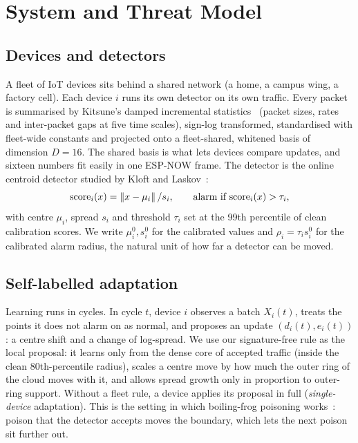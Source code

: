\section{System and Threat Model}\label{sec:model}

\subsection{Devices and detectors}
A fleet of IoT devices sits behind a shared network (a home, a campus wing, a factory cell). Each
device $i$ runs its own detector on its own traffic. Every packet is summarised by Kitsune's damped
incremental statistics~\cite{kitsune} (packet sizes, rates and inter-packet gaps at five time scales),
sign-log transformed, standardised with fleet-wide constants and projected onto a fleet-shared, whitened
basis of dimension $D=16$. The shared basis is what lets devices compare updates, and sixteen numbers
fit easily in one ESP-NOW frame. The detector is the online centroid detector studied by Kloft and Laskov~\cite{kloft}:
\begin{equation}
  \mathrm{score}_i(x) = \left\lVert x-\mu_i \right\rVert/s_i, \qquad \text{alarm if } \mathrm{score}_i(x) > \tau_i,
\end{equation}
with centre $\mu_i$, spread $s_i$ and threshold $\tau_i$ set at the 99th percentile of clean
calibration scores. We write $\mu_i^0, s_i^0$ for the calibrated values and $\rho_i=\tau_i s_i^0$ for
the calibrated alarm radius, the natural unit of how far a detector can be moved.

\subsection{Self-labelled adaptation}
Learning runs in cycles. In cycle $t$, device $i$ observes a batch $X_i(t)$, treats the points it does
not alarm on as normal, and proposes an update $(d_i(t), e_i(t))$: a centre shift and a change of
log-spread. We use our signature-free rule as the local proposal: it learns only from the dense core of
accepted traffic (inside the clean 80th-percentile radius), scales a centre move by how much the outer
ring of the cloud moves with it, and allows spread growth only in proportion to outer-ring support.
Without a fleet rule, a device applies its proposal in full (\emph{single-device} adaptation). This is
the setting in which boiling-frog poisoning works~\cite{antidote,kloft}: poison that the detector accepts
moves the boundary, which lets the next poison sit further out.

